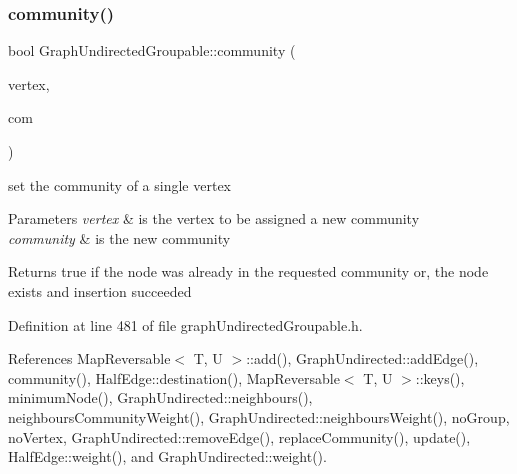\subsubsection{\texorpdfstring{community()}{community()}\hspace{0.1cm}{\footnotesize\ttfamily [2/2]}}
{\footnotesize\ttfamily bool Graph\+Undirected\+Groupable\+::community (\begin{DoxyParamCaption}\item[{const \hyperlink{edge_8h_a5fbd20c46956d479cb10afc9855223f6}{type\+Vertex} \&}]{vertex,  }\item[{const \hyperlink{graphUndirectedGroupable_8h_a914da95c9ea7f14f4b7f875c36818556}{type\+Community} \&}]{com }\end{DoxyParamCaption})\hspace{0.3cm}{\ttfamily [inline]}}

set the community of a single vertex 
\begin{DoxyParams}{Parameters}
{\em vertex} & is the vertex to be assigned a new community \\
\hline
{\em community} & is the new community \\
\hline
\end{DoxyParams}
\begin{DoxyReturn}{Returns}
true if the node was already in the requested community or, the node exists and insertion succeeded 
\end{DoxyReturn}


Definition at line 481 of file graph\+Undirected\+Groupable.\+h.



References Map\+Reversable$<$ T, U $>$\+::add(), Graph\+Undirected\+::add\+Edge(), community(), Half\+Edge\+::destination(), Map\+Reversable$<$ T, U $>$\+::keys(), minimum\+Node(), Graph\+Undirected\+::neighbours(), neighbours\+Community\+Weight(), Graph\+Undirected\+::neighbours\+Weight(), no\+Group, no\+Vertex, Graph\+Undirected\+::remove\+Edge(), replace\+Community(), update(), Half\+Edge\+::weight(), and Graph\+Undirected\+::weight().

